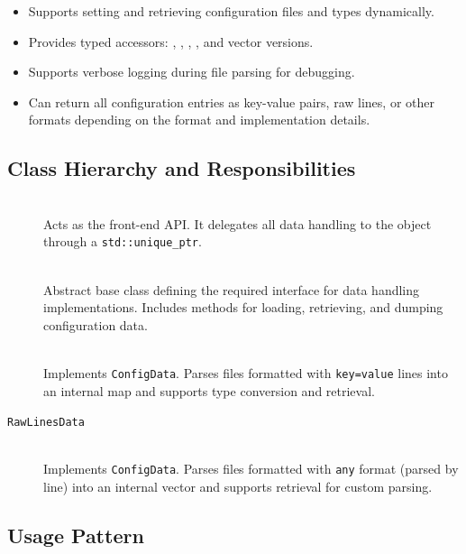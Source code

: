 \begin{itemize}\itemsep0em
	\item Supports setting and retrieving configuration files and types dynamically.
	\item Provides typed accessors: , , , , and vector versions.
	\item Supports verbose logging during file parsing for debugging.
	\item Can return all configuration entries as key-value pairs, raw lines, or other formats depending on the format and implementation details.
\end{itemize}

\subsection{Class Hierarchy and Responsibilities}

\begin{description}
	\item[] 
	\hfill \\
	Acts as the front-end API. It delegates all data handling to the  object through a \texttt{std::unique\_ptr}.

	\item[] 
	\hfill \\
	Abstract base class defining the required interface for data handling implementations. Includes methods for loading, retrieving, and dumping configuration data.

	\item[]
	\hfill \\
	Implements \texttt{ConfigData}. Parses files formatted with \texttt{key=value} lines into an internal map and supports type conversion and retrieval.

	\item[\texttt{RawLinesData}]
	\hfill \\
	Implements \texttt{ConfigData}. Parses files formatted with \texttt{any} format (parsed by line) into an internal vector and supports retrieval for custom parsing.
\end{description}

\subsection{Usage Pattern}

